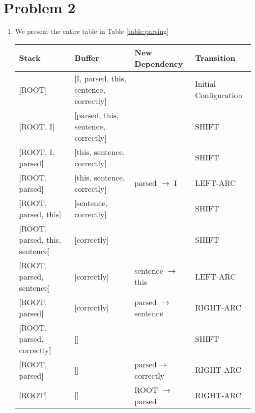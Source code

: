 \documentclass[12pt]{article}
\begin{document}
\section*{Problem 2}
\begin{enumerate}[label=(\alph*)]
  \item We present the entire table in Table \ref{table:parsing}
    \begin{table}[h!]
    \centering
    \begin{tabular}{l|l|l|l}
    Stack                              & Buffer                                     & New Dependency                & Transition            \\ \hline
    {[}ROOT{]}                         & {[}I, parsed, this, sentence, correctly{]} &                               & Initial Configuration \\
    {[}ROOT, I{]}                      & {[}parsed, this, sentence, correctly{]}    &                               & SHIFT                 \\
    {[}ROOT, I, parsed{]}              & {[}this, sentence, correctly{]}            &                               & SHIFT                 \\
    {[}ROOT, parsed{]}                 & {[}this, sentence, correctly{]}            & parsed $\rightarrow$ I        & LEFT-ARC              \\
    {[}ROOT, parsed, this{]}           & {[}sentence, correctly{]}                  &                               & SHIFT                 \\
    {[}ROOT, parsed, this, sentence{]} & {[}correctly{]}                            &                               & SHIFT                 \\
    {[}ROOT, parsed, sentence{]}       & {[}correctly{]}                            & sentence $\rightarrow$ this   & LEFT-ARC              \\
    {[}ROOT, parsed{]}                 & {[}correctly{]}                            & parsed $\rightarrow$ sentence & RIGHT-ARC             \\
    {[}ROOT, parsed, correctly{]}      & {[}{]}                                     &                               & SHIFT                 \\
    {[}ROOT, parsed{]}                 & {[}{]}                                     & parsed$\rightarrow$ correctly & RIGHT-ARC             \\
    {[}ROOT{]}                         & {[}{]}                                     & ROOT $\rightarrow$ parsed     & RIGHT-ARC            

\end{tabular}
\end{table}
\end{enumerate}
\end{document}
